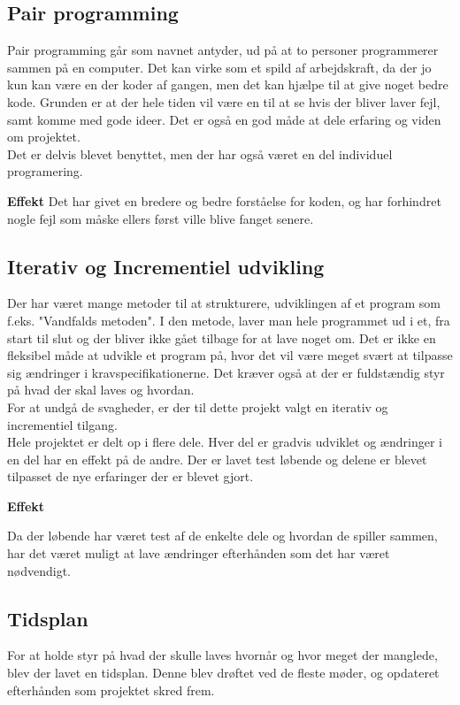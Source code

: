 \subsection{Pair programming}

Pair programming går som navnet antyder, ud på at to personer programmerer sammen på en computer. Det kan virke som et spild af arbejdskraft, da der jo kun kan være en der koder af gangen, men det kan hjælpe til at give noget bedre kode. Grunden er at der hele tiden vil være en til at se hvis der bliver laver fejl, samt komme med gode ideer. Det er også en god måde at dele erfaring og viden om projektet.\\

Det er delvis blevet benyttet, men der har også været en del individuel programering.

\textbf {Effekt}
Det har givet en bredere og bedre forståelse for koden, og har forhindret nogle fejl som måske ellers først ville blive fanget senere.



\subsection{Iterativ og Incrementiel udvikling}
Der har været mange metoder til at strukturere, udviklingen af et program som f.eks. "Vandfalds metoden". I den metode, laver man hele programmet ud i et, fra start til slut og der bliver ikke gået tilbage for at lave noget om. Det er ikke en fleksibel måde at udvikle et program på, hvor det vil være meget svært at tilpasse sig ændringer i kravspecifikationerne. Det kræver også at der er fuldstændig styr på hvad der skal laves og hvordan.\\

For at undgå de svagheder, er der til dette projekt valgt en iterativ og incrementiel tilgang.\\
Hele projektet er delt op i flere dele. Hver del er gradvis udviklet og ændringer i en del har en effekt på de andre. Der er lavet test løbende og delene er blevet tilpasset de nye erfaringer der er blevet gjort.


\textbf{Effekt}

Da der løbende har været test af de enkelte dele og hvordan de spiller sammen, har det været muligt at lave ændringer efterhånden som det har været nødvendigt.\\


\subsection{Tidsplan}
For at holde styr på hvad der skulle laves hvornår og hvor meget der manglede, blev der lavet en tidsplan. Denne blev drøftet ved de fleste møder, og opdateret efterhånden som projektet skred frem.

